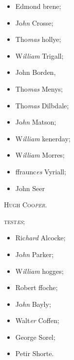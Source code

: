 \documentclass[12pt, a4paper]{book}
\begin{document}
	
		\begin{itemize}
			\item[]Edmond brene;
			\item[]Jo\textit{hn} Crosse;
			\item[]Tho\textit{mas} hollye;
			\item[]W\textit{illiam} Trigall;
			\item[]John Borden,
			\item[]Tho\textit{mas} Menys;
			\item[]Tho\textit{mas} Dilbdale;
			\item[]Jo\textit{hn} Matson;
			\item[]W\textit{illiam} kenerday;
			\item[]W\textit{illiam} Morres;
			\item[]ffraunc\textit{es} Vyriall;
			\item[]John Seer
		\end{itemize}
		
			

 

            
            
            	
				\begin{center} \begin{large} {\scshape Hugh Coo\textit{per}.} \end{large} \end{center}
			

 
 	
 	\begin{center} {\scshape test\textit{es};} \end{center}\begin{itemize}
 		
 		\item[]Ric\textit{hard} Alcocke;
 		\item[]Jo\textit{hn} Parker;
 		\item[]W\textit{illiam} hogges;
 		\item[]Robert ffoche;
 		\item[]Jo\textit{hn} Bayly;
 		\item[]Walt\textit{er} Coffen;
 		\item[]George Sorel;
 		\item[]Petir Shorte.
 	\end{itemize}
			 
\end{document}
